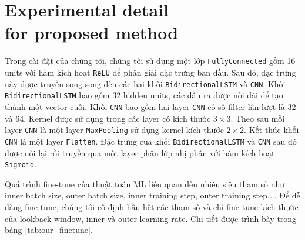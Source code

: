 \documentclass[aps,prb,groupedaddress,twocolumn,showpacs,dvipdfmx,superscriptaddress,pdftex]{revtex4-2}
\begin{document}
\section{Experimental detail\\for proposed method}
\label{app:our_experiment}

Trong cài đặt của chúng tôi, chúng tôi sử dụng một lớp \verb|FullyConnected| gồm 16 units với hàm kích hoạt \verb|ReLU| để phân giải đặc trưng ban đầu. Sau đó, đặc trưng này được truyền song song đến các hai khối \verb|BidirectionalLSTM| và \verb|CNN|. Khối \verb|BidirectionalLSTM| bao gồm 32 hidden units, các đầu ra được nối dài để tạo thành một vector cuối. Khối \verb|CNN| bao gồm hai layer \verb|CNN| có số filter lần lượt là 32 và 64. Kernel được sử dụng trong các layer có kích thước $3\times 3$. Theo sau mỗi layer \verb|CNN| là một layer \verb|MaxPooling| sử dụng kernel kích thước $2\times 2$. Kết thúc khối \verb|CNN| là một layer \verb|Flatten|. Đặc trưng của khối \verb|BidirectionalLSTM| và \verb|CNN| sau đó được nối lại rồi truyền qua một layer phân lớp nhị phân với hàm kích hoạt \verb|Sigmoid|.


\vspace{2mm}

Quá trình fine-tune của thuật toán ML liên quan đến nhiều siêu tham số như inner batch size, outer batch size, inner training step, outer training step,... Để dễ dàng fine-tune, chúng tôi cố định hầu hết các tham số và chỉ fine-tune kích thước của lookback window, inner và outer learning rate. Chi tiết được trình bày trong bảng \ref{tab:our_finetune}.

\end{document}

